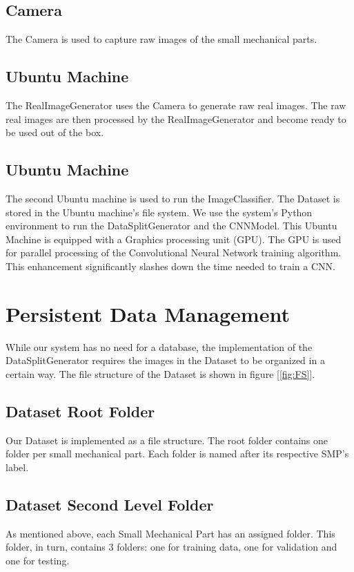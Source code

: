 \documentclass[a4paper,12pt,twoside]{report}
\begin{document}
\subsection{Camera}
The Camera is used to capture raw images of the small mechanical parts.

\subsection{Ubuntu Machine}
The RealImageGenerator uses the Camera to generate raw real images. The raw real images are then processed by the RealImageGenerator and become ready to be used out of the box.

\subsection{Ubuntu Machine}
The second Ubuntu machine is used to run the ImageClassifier. The Dataset is stored in the Ubuntu machine's file system. We use the system's Python environment to run the DataSplitGenerator and the CNNModel. This Ubuntu Machine is equipped with a Graphics processing unit (GPU). The GPU is used for parallel processing of the Convolutional Neural Network training algorithm. This enhancement significantly slashes down the time needed to train a CNN.

\section{Persistent Data Management}

While our system has no need for a database, the implementation of the DataSplitGenerator requires the images in the Dataset to be organized in a certain way. The file structure of the Dataset is shown in figure [\ref{fig:FS}].

\subsection{Dataset Root Folder}
Our Dataset is implemented as a file structure. The root folder contains one folder per small mechanical part. Each folder is named after its respective SMP's label.

\subsection{Dataset Second Level Folder}
As mentioned above, each Small Mechanical Part has an assigned folder. This folder, in turn, contains 3 folders: one for training data, one for validation and one for testing.
\end{document}
